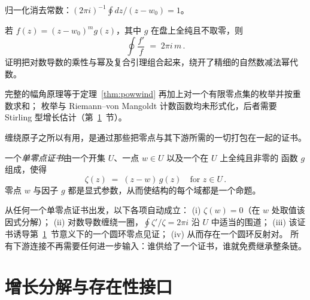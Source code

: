 \begin{proposition}\label{prop:norm}
归一化消去常数：$(2\pi i)^{-1}\oint dz/(z-w_{0})=1$。
\end{proposition}

\begin{theorem}
\label{thm:powwind}
若 $f(z)=(z-w_{0})^{m}g(z)$，其中 $g$ 在盘上全纯且不取零，则
\[
  \oint \frac{f'}{f} \;=\; 2\pi i\, m\, .
\]
证明把对数导数的乘性与幂及复合引理组合起来，绕开了精细的自然数减法幂代数。
\end{theorem}

\begin{remark}[幅角原理的完成度]
完整的幅角原理等于定理~\ref{thm:powwind} 再加上对一个有限零点集的枚举并按重数求和；
枚举与 Riemann--von Mangoldt 计数函数均未形式化，后者需要 Stirling
型增长估计（第~\ref{sec:growth}~节）。
\end{remark}

缠绕原子之所以有用，是通过那些把零点与其下游所需的一切打包在一起的证书。

\begin{definition}\label{def:cert}
一个\emph{单零点证书}由一个开集 $U$、一点 $w\in U$ 以及一个在 $U$ 上全纯且非零的
函数 $g$ 组成，使得
\[
  \zeta(z) \;=\; (z-w)\, g(z) \quad\text{for } z\in U\, .
\]
零点 $w$ 与因子 $g$ 都是显式参数，从而使结构的每个域都是一个命题。
\end{definition}

\begin{theorem}\label{thm:certchain}
从任何一个单零点证书出发，以下各项自动成立：
(i) $\zeta(w)=0$（在 $w$ 处取值该因式分解）；
(ii) 对数导数缠绕一圈，$\oint\zeta'/\zeta=2\pi i$ 沿 $U$ 中适当的围道；
(iii) 该证书诱导第~\ref{sec:growth}~节意义下的一个圆环零点见证；
(iv) 从而存在一个圆环反射对。
所有下游连接不再需要任何进一步输入：谁供给了一个证书，谁就免费继承整条链。
\end{theorem}

\section{增长分解与存在性接口}\label{sec:growth}

